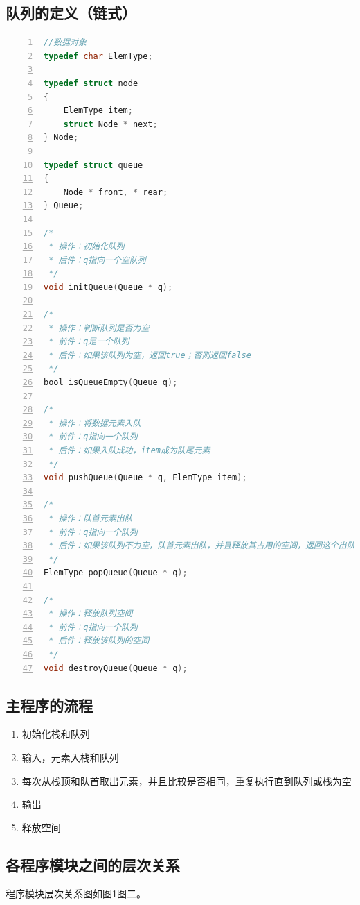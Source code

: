 \documentclass{article}
\begin{document}
\subsection{队列的定义（链式）}

\begin{lstlisting}[language={C},
    numbers=left,
    numberstyle=\tiny\consolas,
    basicstyle=\small\consolas]
//数据对象
typedef char ElemType;

typedef struct node
{
    ElemType item;
    struct Node * next;
} Node;

typedef struct queue
{
    Node * front, * rear;
} Queue;

/*
 * 操作：初始化队列
 * 后件：q指向一个空队列
 */
void initQueue(Queue * q);

/*
 * 操作：判断队列是否为空
 * 前件：q是一个队列
 * 后件：如果该队列为空，返回true；否则返回false
 */
bool isQueueEmpty(Queue q);

/*
 * 操作：将数据元素入队
 * 前件：q指向一个队列
 * 后件：如果入队成功，item成为队尾元素
 */
void pushQueue(Queue * q, ElemType item);

/*
 * 操作：队首元素出队
 * 前件：q指向一个队列
 * 后件：如果该队列不为空，队首元素出队，并且释放其占用的空间，返回这个出队的元素
 */
ElemType popQueue(Queue * q);

/*
 * 操作：释放队列空间
 * 前件：q指向一个队列
 * 后件：释放该队列的空间
 */
void destroyQueue(Queue * q);
\end{lstlisting}

\subsection{主程序的流程}

\begin{enumerate}
    \item 初始化栈和队列
    \item 输入，元素入栈和队列
    \item 每次从栈顶和队首取出元素，并且比较是否相同，重复执行直到队列或栈为空
    \item 输出
    \item 释放空间
\end{enumerate}

\subsection{各程序模块之间的层次关系}

程序模块层次关系图如图1图二。
\end{document}
